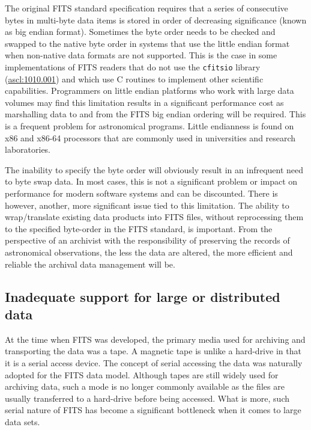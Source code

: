 \documentclass[final,authoryear,5p,times,twocolumn]{elsarticle}
\begin{document}
{{The original FITS standard specification \citep{1981A&AS...44..363W}
requires that a series of consecutive bytes in multi-byte data items is
stored in order of decreasing significance (known as big endian format).
Sometimes the byte order needs to be checked and swapped to the native byte
order in systems that use the little endian format when non-native data
formats are not supported.  This is the case in some implementations of FITS
readers that do not use the \texttt{cfitsio} library
(\href{http://ascl.net/1010.001}{ascl:1010.001}) and which use C
routines to implement other scientific capabilities.  Programmers on little
endian platforms who work with large data volumes may find this limitation
results in a significant performance cost as marshalling data to and from
the FITS big endian ordering will be required.  This is a frequent problem
for astronomical programs. Little endianness is found on x86 and x86-64
processors that are commonly used in universities and research laboratories.


The inability to specify the byte order will obviously result in an infrequent
need to byte swap data. In most cases, this is not a significant
problem or impact on performance for modern software systems and
can be discounted. There is however, another, more significant issue
tied to this limitation. The ability to wrap/translate existing data products 
into FITS files, without reprocessing them to the specified
byte-order in the FITS standard, is important. From
the perspective of an archivist with the responsibility of preserving the
records of astronomical observations, the less the data are altered, the
more efficient and reliable the archival data management will be.


\subsection{Inadequate support for large or distributed data}
\label{section_poor_large_data_support}


At the time when FITS was developed, the primary media used for
archiving and transporting the data was a tape. A magnetic tape is
unlike a hard-drive in that it is a serial access device.  The concept
of serial accessing the data was naturally adopted for the FITS data
model.  Although tapes are still widely used for archiving data,
such a mode is no longer commonly available as the files are usually
transferred to a hard-drive before being accessed. What is more, such
serial nature of FITS has become a significant bottleneck when it comes
to large data sets.

}}
\end{document}
